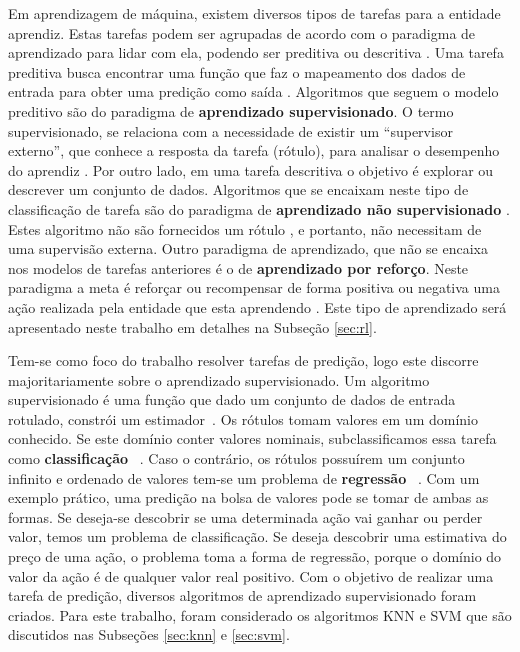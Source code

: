 Em aprendizagem de máquina, existem diversos tipos de tarefas para a entidade aprendiz. Estas tarefas podem ser agrupadas de acordo com o paradigma de aprendizado para lidar com ela, podendo ser preditiva ou descritiva \cite{faceli2011inteligencia}. Uma tarefa preditiva busca encontrar uma função que faz o mapeamento dos dados de entrada para obter uma predição como saída \cite{modern_approach}. Algoritmos que seguem o modelo preditivo são do paradigma de \textbf{aprendizado supervisionado}. O termo supervisionado, se relaciona com a necessidade de existir um ``supervisor externo'', que conhece a resposta da tarefa (rótulo), para analisar o desempenho do aprendiz \cite{faceli2011inteligencia}. Por outro lado, em uma tarefa descritiva o objetivo é explorar ou descrever um conjunto de dados. Algoritmos que se encaixam neste tipo de classificação de tarefa são do paradigma de \textbf{aprendizado não supervisionado} \cite{faceli2011inteligencia}. Estes algoritmo não são fornecidos um rótulo \cite{modern_approach}, e portanto, não necessitam de uma supervisão externa. Outro paradigma de aprendizado, que não se encaixa nos modelos de tarefas anteriores é o de \textbf{aprendizado por reforço}. Neste paradigma a meta é reforçar ou recompensar de forma positiva ou negativa uma ação realizada pela entidade que esta aprendendo \cite{faceli2011inteligencia}. Este tipo de aprendizado será apresentado neste trabalho em detalhes na Subseção \ref{sec:rl}.

Tem-se como foco do trabalho resolver tarefas de predição, logo este discorre majoritariamente sobre o aprendizado supervisionado. Um algoritmo supervisionado é uma função que dado um conjunto de dados de entrada rotulado, constrói um estimador~\cite{faceli2011inteligencia}. Os rótulos tomam valores em um domínio conhecido. Se este domínio conter valores nominais, subclassificamos essa tarefa como \textbf{classificação}~ \cite{modern_approach}. Caso o contrário, os rótulos possuírem um conjunto infinito e ordenado de valores tem-se um problema de \textbf{regressão}~ \cite{faceli2011inteligencia}. Com um exemplo prático, uma predição na bolsa de valores pode se tomar de ambas as formas. Se deseja-se descobrir se uma determinada ação vai ganhar ou perder valor, temos um problema de classificação. Se deseja descobrir uma estimativa do preço de uma ação, o problema toma a forma de regressão, porque o domínio do valor da ação é de qualquer valor real positivo. Com o objetivo de realizar uma tarefa de predição, diversos algoritmos de aprendizado supervisionado foram criados. Para este trabalho, foram considerado os algoritmos \acrlong{KNN} e \acrlong{SVM} que são discutidos nas Subseções \ref{sec:knn} e \ref{sec:svm}.


